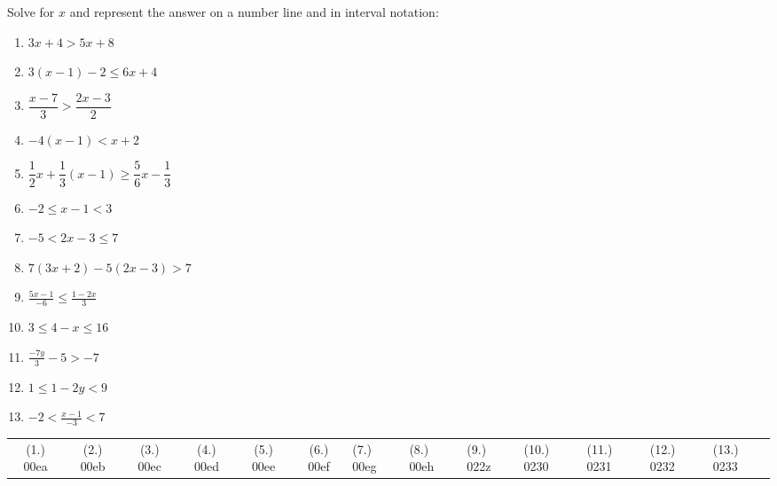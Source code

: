 \begin{exercises}{}
{Solve for $x$ and represent the answer on a number line and in interval notation:

\begin{enumerate}[itemsep=6pt, label=\textbf{\arabic*}. ] 
    \item $3x+4>5x+8$
    \item $3(x-1)-2\leq 6x+4$ 
    \item $\dfrac{x-7}{3}>\dfrac{2x-3}{2}$
    \item $-4(x-1)<x+2$
    \item $\dfrac{1}{2}x+\dfrac{1}{3}(x-1)\geq \dfrac{5}{6}x-\dfrac{1}{3}$ 
    \item $-2\leq x-1<3$ 
    \item $-5<2x-3\leq7$ 
\item $7(3x+2)-5(2x-3)>7$
\item $\frac{5x - 1}{-6} \leq \frac{1-2x}{3}$
\item $3 \leq 4 - x \leq 16$
\item $\frac{-7y}{3} - 5 > -7$
\item $1 \leq 1 - 2y < 9$
\item $-2 < \frac{x-1}{-3}<7$
    \end{enumerate}

\practiceinfo
\par 
\par \begin{tabular}[h]{cccccc}
(1.) 00ea&  (2.) 00eb&  (3.) 00ec& (4.) 00ed& (5.) 00ee& (6.) 00ef& (7.) 00eg& (8.) 00eh & (9.) 022z & (10.) 0230 
& (11.) 0231 & (12.) 0232 & (13.) 0233 &\end{tabular}
}
\end{exercises}


